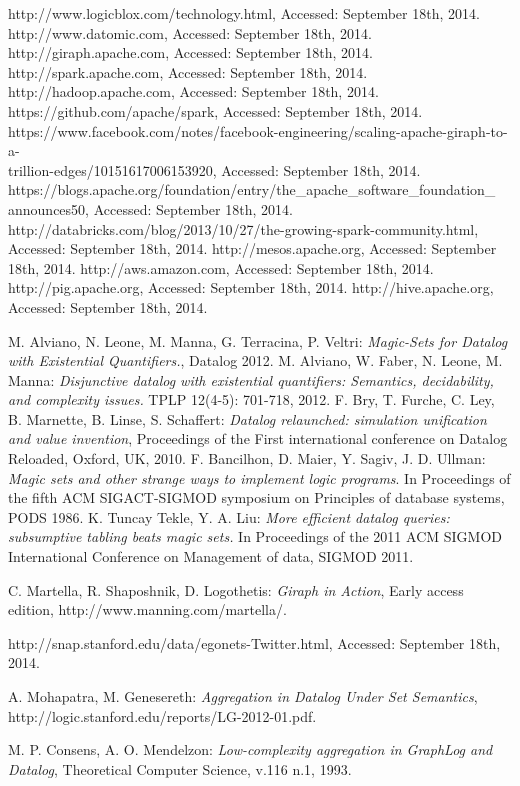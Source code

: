 \begin{thebibliography}{99}
 http://www.logicblox.com/technology.html, Accessed: September 18th, 2014.
 http://www.datomic.com, Accessed: September 18th, 2014.
 http://giraph.apache.com, Accessed: September 18th, 2014.
 http://spark.apache.com, Accessed: September 18th, 2014.
 http://hadoop.apache.com, Accessed: September 18th, 2014.
 https://github.com/apache/spark, Accessed: September 18th, 2014.
 https://www.facebook.com/notes/facebook-engineering/scaling-apache-giraph-to-a-\\trillion-edges/10151617006153920, Accessed: September 18th, 2014.
 https://blogs.apache.org/foundation/entry/the\_apache\_software\_foundation\_\\announces50, Accessed: September 18th, 2014.
 http://databricks.com/blog/2013/10/27/the-growing-spark-community.html, Accessed: September 18th, 2014.
 http://mesos.apache.org, Accessed: September 18th, 2014.
 http://aws.amazon.com, Accessed: September 18th, 2014.
 http://pig.apache.org, Accessed: September 18th, 2014.
 http://hive.apache.org, Accessed: September 18th, 2014.

 M. Alviano, N. Leone, M. Manna, G. Terracina, P. Veltri: \textit{Magic-Sets for Datalog with Existential Quantifiers.}, Datalog 2012.
 M. Alviano, W. Faber, N. Leone, M. Manna: \textit{Disjunctive datalog with existential quantifiers: Semantics, decidability, and complexity issues.} TPLP 12(4-5): 701-718, 2012.
 F. Bry, T. Furche, C. Ley, B. Marnette, B. Linse, S. Schaffert: \textit{Datalog relaunched: simulation unification and value invention}, Proceedings of the First international conference on Datalog Reloaded, Oxford, UK, 2010.
 F. Bancilhon, D. Maier, Y. Sagiv, J. D. Ullman: \textit{Magic sets and other strange ways to implement logic programs}. In Proceedings of the fifth ACM SIGACT-SIGMOD symposium on Principles of database systems, PODS 1986.
 K. Tuncay Tekle, Y. A. Liu: \textit{More efficient datalog queries: subsumptive tabling beats magic sets.} In Proceedings of the 2011 ACM SIGMOD International Conference on Management of data, SIGMOD 2011.

 C. Martella, R. Shaposhnik, D. Logothetis: \textit{Giraph in Action}, Early access edition, http://www.manning.com/martella/.

 http://snap.stanford.edu/data/egonets-Twitter.html, Accessed: September 18th, 2014.

 A. Mohapatra, M. Genesereth: \textit{Aggregation in Datalog Under Set Semantics}, http://logic.stanford.edu/reports/LG-2012-01.pdf.

 M. P. Consens, A. O. Mendelzon: \textit{Low-complexity aggregation in GraphLog and Datalog}, Theoretical Computer Science, v.116 n.1, 1993.

\end{thebibliography}

